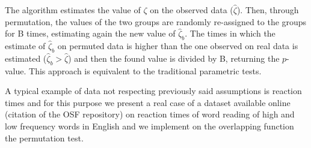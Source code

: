 \documentclass[twocolumn]{article}
\begin{document}
The algorithm estimates the value of $\zeta$ on the observed data ($\hat{\zeta}$). Then, through permutation, the values of the two groups are randomly re-assigned to the groups for B times, estimating again the new value of  $\hat{\zeta}_b$. The times in which the estimate of $\hat{\zeta}_b$ on permuted data is higher than the one observed on real data is estimated ($\hat{\zeta}_b > \hat{\zeta}$) and then the found value is divided by B, returning the $p$-value. This approach is equivalent to the traditional parametric tests.

A typical example of data not respecting previously said assumptions is reaction times and for this purpose we present a real case of a dataset available online (citation of the OSF repository) on reaction times of word reading of high and low frequency words in English and we implement on the overlapping function the permutation test. 
\end{document}

